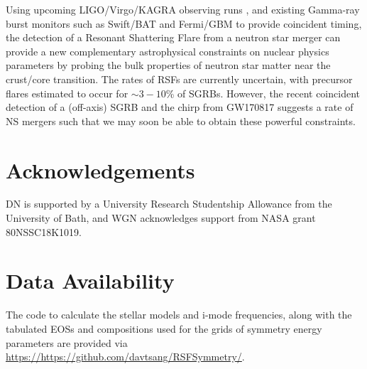 \documentclass[fleqn,usenatbib]{mnras}
\begin{document}
Using upcoming LIGO/Virgo/KAGRA observing runs \citep{abbott2020prospects}, and existing Gamma-ray burst monitors such as Swift/BAT \citep{barthelmy2005burst} and Fermi/GBM \citep{meegan2009fermi} to provide coincident timing, the detection of a Resonant Shattering Flare from a neutron star merger can provide a new complementary astrophysical constraints on nuclear physics parameters by probing the bulk properties of neutron star matter near the crust/core transition. The rates of RSFs are currently uncertain, with precursor flares estimated to occur for $\sim3-10$\% of SGRBs. However, the recent coincident detection of a (off-axis) SGRB and the chirp from GW170817 suggests a rate of NS mergers such that we may soon be able to obtain these powerful constraints.  

\section*{Acknowledgements}
DN is supported by a University Research Studentship Allowance from the University of Bath, and WGN acknowledges support from NASA grant 80NSSC18K1019.



\section*{Data Availability}
The code to calculate the stellar models and i-mode frequencies, along with the tabulated EOSs and compositions used for the grids of symmetry energy parameters are provided via \url{https://https://github.com/davtsang/RSFSymmetry/}.






\end{document}

